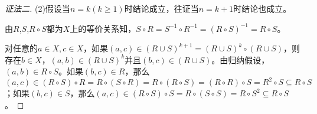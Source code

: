 \documentclass{article}
\begin{document}
\begin{CJK}{UTF8}{gbsn}
\begin{proof}[证法二]
        (2)假设当$n=k(k\geq 1)$时结论成立，往证当$n=k+1$时结论也成立。
      
        由$R$,$S$,$R\circ S$都为$X$上的等价关系知，$S\circ R=S^{-1}\circ R^{-1}=(R\circ S)^{-1}=R\circ S$。
      
        对任意的$a\in X,c\in X$，如果$(a,c)\in (R\cup S)^{k+1}=(R\cup S)^k\circ (R\cup S)$，则存在$b\in X$，$(a,b)\in (R\cup S)^k$并且$(b,c)\in (R\cup S)$。由归纳假设，$(a,b)\in R\circ S$。如果$(b,c)\in R$，那么$(a,c)\in (R\circ S)\circ R = R\circ (S\circ R) = R\circ (R\circ S) = (R\circ R)\circ S = R^2\circ S \subseteq R\circ S$；如果$(b,c)\in S$，那么$(a,c)\in (R\circ S)\circ S = R\circ (S\circ S) = R\circ S^2 \subseteq R\circ S$。
        
      
        
      \end{proof}
      
\end{CJK}
\end{document}
